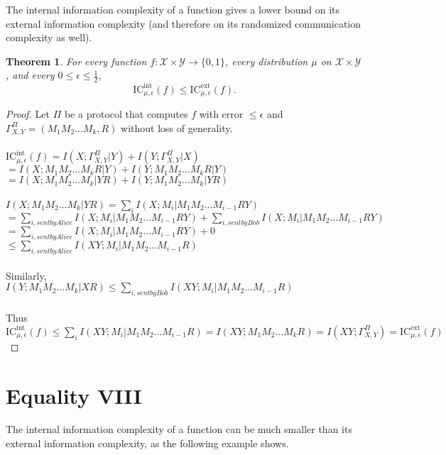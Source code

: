 \documentclass[11pt,oneside]{book}
\theoremstyle{plain}
\newtheorem{theorem}{Theorem}
\theoremstyle{definition}
\theoremstyle{plain}
\newcommand{\calX}{\mathcal{X}}
\newcommand{\calY}{\mathcal{Y}}
\newcommand{\ICext}{\mathrm{IC}^{\mathrm{ext}}}
\newcommand{\ICint}{\mathrm{IC}^{\mathrm{int}}}
\begin{document}
The internal information complexity of a function gives a lower bound on its external information complexity (and therefore on its randomized communication complexity as well).

\begin{theorem}
	For every function $f : \calX \times \calY \to \{0,1\}$, every distribution $\mu$ on $\calX \times \calY$, and every $0 \le \epsilon \le \frac12$,
	\[
	\ICint_{\mu,\epsilon}(f) \le \ICext_{\mu,\epsilon}(f).
	\]
\end{theorem}

\begin{proof}
	Let $\Pi$ be a protocol that computes $f$ with error $\leq \epsilon$ and $\Gamma_{X,Y}^\Pi = (M_1M_2...M_k,R)$ without loss of generality.\\
	 \\
	$\ICint_{\mu,\epsilon}(f) = I(X;\Gamma_{X,Y}^\Pi|Y)+I(Y;\Gamma_{X,Y}^\Pi|X)$\\
	$=I(X;M_1M_2...M_kR|Y)+I(Y;M_1M_2...M_kR|Y)$\\
	$=I(X;M_1M_2...M_k|YR)+I(Y;M_1M_2...M_k|YR)$\\ 
	 \\
	$I(X;M_1M_2...M_k|YR)=\sum_i I(X;M_i|M_1M_2...M_{i-1}RY)$\\
	$=\sum_{i,sent by Alice} I(X;M_i|M_1M_2...M_{i-1}RY)+\sum_{i,sent by Bob} I(X;M_i|M_1M_2...M_{i-1}RY)$\\
	$=\sum_{i,sent by Alice} I(X;M_i|M_1M_2...M_{i-1}RY)+0$\\
	$\leq \sum_{i,sent by Alice} I(XY;M_i|M_1M_2...M_{i-1}R)$\\
	 \\
	Similarly, \\
	$I(Y;M_1M_2...M_k|XR) \leq \sum_{i,sent by Bob} I(XY;M_i|M_1M_2...M_{i-1}R)$\\
	 \\
	Thus $\ICint_{\mu,\epsilon}(f) \leq \sum_i I(XY;M_i|M_1M_2...M_{i-1}R) = I(XY;M_1M_2...M_kR) = I(XY;\Gamma_{X,Y}^\Pi) = \ICext_{\mu,\epsilon}(f)$
\end{proof}


 
\section{Equality VIII}

The internal information complexity of a function can be much smaller than its external information complexity, as the following example shows.
\end{document}
